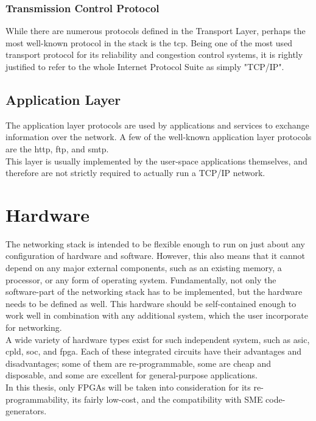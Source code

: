 \subsubsection{Transmission Control Protocol}
While there are numerous protocols defined in the Transport Layer, perhaps the
most well-known protocol in the stack is the \gls{tcp}.
Being one of the most used transport protocol for its reliability and congestion
control systems, it is rightly justified to refer to the whole Internet Protocol
Suite as simply "TCP/IP".\\



\subsection{Application Layer}
The application layer protocols are used by applications and services to
exchange information over the network. A few of the well-known application
layer protocols are the \gls{http}\cite{RFC1945},
\gls{ftp}\cite{RFC0114}, and \gls{smtp}\cite{RFC0788}.\\
This layer is usually implemented by the user-space applications themselves, and
therefore are not strictly required to actually run a TCP/IP network.



\section{Hardware}
The networking stack is intended to be flexible enough to run on just about any
configuration of hardware and software. However, this also means that it cannot
depend on any major external components, such as an existing memory, a processor,
or any form of operating system. Fundamentally, not only the software-part of the
networking stack has to be implemented, but the hardware needs to be defined
as well. This hardware should be self-contained enough to work well in combination
with any additional system, which the user incorporate for networking.\\
A wide variety of hardware types exist for such independent system, such as
\gls{asic}, \gls{cpld}, \gls{soc}, and \gls{fpga}.
Each of these integrated circuits have their advantages and disadvantages; some
of them are re-programmable, some are cheap and disposable, and some are excellent
for general-purpose applications.\\
In this thesis, only FPGAs will be taken into consideration for its re-programmability,
its fairly low-cost, and the compatibility with SME code-generators.


